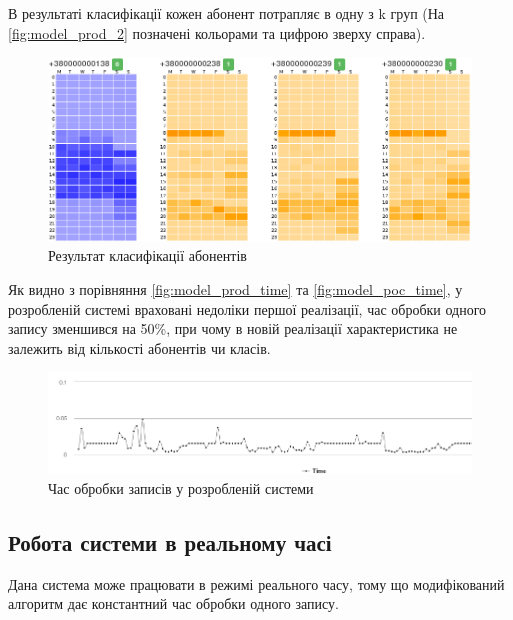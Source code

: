 В результаті класифікації кожен абонент потрапляє в одну з k груп (На \autoref{fig:model_prod_2} позначені кольорами та цифрою зверху справа).

\begin{figure}[h!]
        \begin{center}
            \includegraphics[scale=0.4]{resources/model_2_2.png}
        \end{center}
        \caption{Результат класифікації абонентів}
        \label{fig:model_prod_2}
\end{figure}

Як видно з порівняння \autoref{fig:model_prod_time} та \autoref{fig:model_poc_time}, у розробленій системі враховані недоліки першої реалізації, час обробки одного запису зменшився на 50\%, при чому в новій реалізації характеристика не залежить від кількості абонентів чи класів.

\begin{figure}[h!]
        \begin{center}
            \includegraphics[scale=0.5]{resources/system-time.png}
        \end{center}
        \caption{Час обробки записів у розробленій системи}
        \label{fig:model_prod_time}
\end{figure}

\subsection{Робота системи в реальному часі}

Дана система може працювати в режимі реального часу, тому що модифікований алгоритм дає константний час обробки одного запису.

